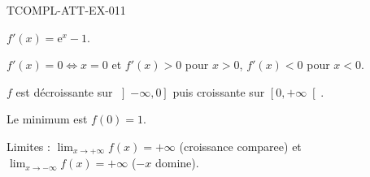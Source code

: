 \begin{corrige}{TCOMPL-ATT-EX-011}

$f'(x) = \mathrm{e}^x - 1$.


$f'(x) = 0 \iff x = 0$ et $f'(x) > 0$ pour $x > 0$, $f'(x) < 0$ pour $x < 0$.

$f$ est décroissante sur $\left]-\infty, 0\right]$ puis croissante sur $\left[0, +\infty\right[$.

Le minimum est $f(0) = 1$.

Limites : $\lim_{x \to +\infty} f(x) = +\infty$ (croissance comparee) et $\lim_{x \to -\infty} f(x) = +\infty$ ($-x$ domine).

\end{corrige}
